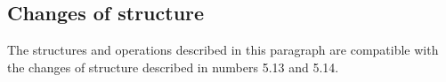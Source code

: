 \subsection{Changes of structure}

The structures and operations described in this paragraph are compatible with the changes of structure described in numbers 5.13 and 5.14.

